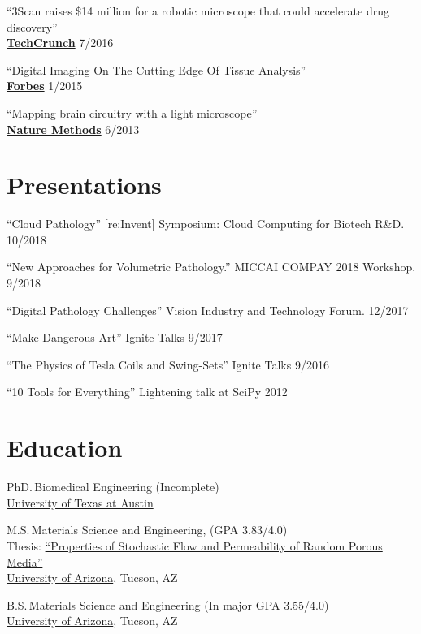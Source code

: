 \documentclass{res}
\begin{document}
\begin{resume}
  ``3Scan raises \$14 million for a robotic microscope that could accelerate drug discovery'' \\
  \href{https://techcrunch.com/2016/07/11/3scan-raises-14-million-for-a-robotic-microscope-that-could-accelerate-drug-discovery/
  }{\textbf{TechCrunch}} \hfill 7/2016
  
  ``Digital Imaging On The Cutting Edge Of Tissue Analysis'' \\
  \href{https://www.forbes.com/sites/joshwolfe/2015/01/28/digital-imaging-on-the-cutting-edge-of-tissue-analysis/}{\textbf{Forbes}} \hfill 1/2015
  
  ``Mapping brain circuitry with a light microscope'' \\
  \href{https://www.ncbi.nlm.nih.gov/pmc/articles/PMC3982327/}{\textbf{Nature Methods}} \hfill 6/2013
  
\section{Presentations}
  ``Cloud Pathology''
  [re:Invent] Symposium: Cloud Computing for Biotech R\&D. \hfill 10/2018

  ``New Approaches for Volumetric Pathology.''
  MICCAI COMPAY 2018 Workshop. \hfill 9/2018

  ``Digital Pathology Challenges''
  Vision Industry and Technology Forum. \hfill 12/2017

  ``Make Dangerous Art''
  Ignite Talks \hfill 9/2017

  ``The Physics of Tesla Coils and Swing-Sets''
  Ignite Talks \hfill 9/2016

  ``10 Tools for Everything''
  Lightening talk at SciPy \hfill 2012

\section{Education}
  PhD.\,Biomedical Engineering (Incomplete) \\
  \href{https://www.bme.utexas.edu/}{University of Texas at Austin}
  
  M.S.\,Materials Science and Engineering,
  (GPA 3.83/4.0) \\
  Thesis: \href{http://hdl.handle.net/10150/193422}{``Properties of Stochastic Flow and Permeability of Random Porous Media''} \\
  \href{https://mse.engineering.arizona.edu/}{University of Arizona}, Tucson, AZ
  
  B.S.\,Materials Science and Engineering (In major GPA 3.55/4.0) \\
  \href{https://mse.engineering.arizona.edu/}{University of Arizona}, Tucson, AZ


\end{resume}
\end{document}
